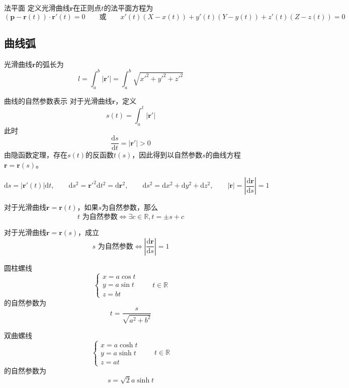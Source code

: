 \documentclass[lang = cn, scheme = chinese, thmcnt = section]{elegantbook}
\newcommand{\R}{\mathbb{R}}            %
\newcommand{\bs}{\boldsymbol}          %
\newcommand{\dd}{\mathrm{d}}           %
\begin{document}
\begin{definition}{法平面}
	定义光滑曲线$\bs{r}$在正则点$t$的法平面方程为
	$$
	(\bs{p}-\bs{r}(t))\cdot\bs{r}'(t)=0\qquad 
	\text{或}\qquad
	x'(t)(X-x(t))+y'(t)(Y-y(t))+z'(t)(Z-z(t))=0
	$$
\end{definition}

\subsection{曲线弧}

\begin{theorem}
	光滑曲线$\bs{r}$的弧长为
	$$
	l=\int_a^b |\bs{r}'|=\int_a^b \sqrt{x'^2+y'^2+z'^2}
	$$
\end{theorem}

\begin{definition}{曲线的自然参数表示}
	对于光滑曲线$\bs{r}$，定义
	$$
	s(t)=\int_a^t |\bs{r}'|
	$$
	此时
	$$
	\frac{\dd s}{\dd t}=|\bs{r}'|>0
	$$
	由隐函数定理，存在$s(t)$的反函数$t(s)$，因此得到以自然参数$s$的曲线方程$\bs{r}=\bs{r}(s)$。
\end{definition}

\begin{proposition}
	$$
	\dd s = |\bs{r}'(t)|\dd t,\qquad 
	\dd s^2=\bs{r}'^2\dd t^2=\dd \bs{r}^2,\qquad 
	\dd s^2=\dd x^2+\dd y^2+\dd z^2,\qquad
	|\dot{\bs{r}}|=\left|\frac{\dd \bs{r}}{\dd s}\right|=1
	$$
\end{proposition}

\begin{theorem}
	对于光滑曲线$\bs{r}=\bs{r}(t)$，如果$s$为自然参数，那么
	$$
	t\text{ 为自然参数}\iff \exists c\in\R, t=\pm s+c
	$$
\end{theorem}

\begin{theorem}
	对于光滑曲线$\bs{r}=\bs{r}(s)$，成立
	$$
	s\text{ 为自然参数}\iff \left|\frac{\dd \bs{r}}{\dd s}\right|=1
	$$
\end{theorem}

\begin{example}
	圆柱螺线
	$$
	\begin{cases}
		x=a\cos t\\
		y=a\sin t\\
		z=bt
	\end{cases}\qquad 
	t\in\R
	$$
	的自然参数为
	$$
	t=\frac{s}{\sqrt{a^2+b^2}}
	$$
\end{example}

\begin{example}
	双曲螺线
	$$
	\begin{cases}
		x=a\cosh t\\
		y=a\sinh t\\
		z=at
	\end{cases}\qquad 
	t\in\R
	$$
	的自然参数为
	$$
	s=\sqrt{2}a\sinh t
	$$
\end{example}
\end{document}
